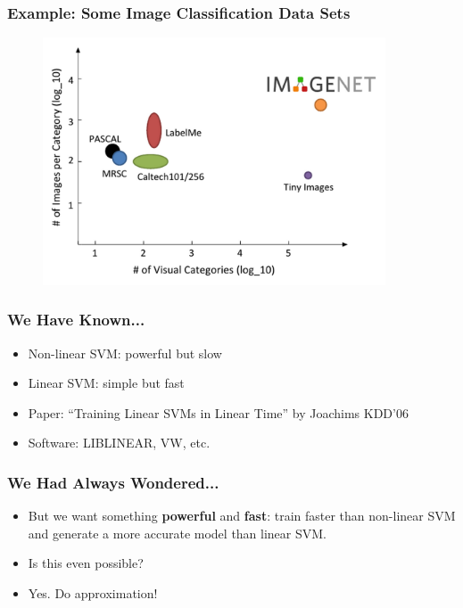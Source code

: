 \documentclass{beamer}
\def\liblinear{{{\sf LIBLINEAR}\xspace}}
\def\vw{{\sf VW}\xspace}
\begin{document}
\begin{frame}
  \frametitle{Example: Some Image Classification Data Sets}
  \begin{figure}
  \includegraphics[width=4in]{tasks_summary.png}\\
  \end{figure}
\end{frame}

\begin{frame}
  \frametitle{We Have Known...}
  \begin{itemize}
    \item Non-linear SVM: powerful but slow 
    \item Linear SVM: simple but fast  
    \item [] Paper: ``Training Linear SVMs in Linear Time'' by Joachims KDD'06
    \item [] Software: \liblinear, \vw, etc.
  \end{itemize}
\end{frame}

\begin{frame}
  \frametitle{We Had Always Wondered...}
  \begin{itemize}
    \item But we want something {\bf powerful} and {\bf fast}: train faster than non-linear SVM and generate a more accurate model than linear SVM.
    \pause
    \item [] Is this even possible? 
    \pause
    \item [] Yes. Do approximation!
  \end{itemize}
\end{frame}
\end{document}
